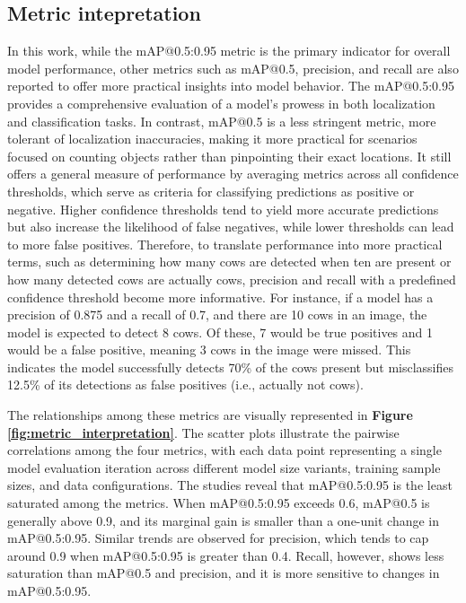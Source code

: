 \subsection*{Metric intepretation}

In this work, while the mAP@0.5:0.95 metric is the primary indicator for overall model performance, other metrics such as mAP@0.5, precision, and recall are also reported to offer more practical insights into model behavior. The mAP@0.5:0.95 provides a comprehensive evaluation of a model's prowess in both localization and classification tasks. In contrast, mAP@0.5 is a less stringent metric, more tolerant of localization inaccuracies, making it more practical for scenarios focused on counting objects rather than pinpointing their exact locations. It still offers a general measure of performance by averaging metrics across all confidence thresholds, which serve as criteria for classifying predictions as positive or negative. Higher confidence thresholds tend to yield more accurate predictions but also increase the likelihood of false negatives, while lower thresholds can lead to more false positives. Therefore, to translate performance into more practical terms, such as determining how many cows are detected when ten are present or how many detected cows are actually cows, precision and recall with a predefined confidence threshold become more informative. For instance, if a model has a precision of 0.875 and a recall of 0.7, and there are 10 cows in an image, the model is expected to detect 8 cows. Of these, 7 would be true positives and 1 would be a false positive, meaning 3 cows in the image were missed. This indicates the model successfully detects 70\% of the cows present but misclassifies 12.5\% of its detections as false positives (i.e., actually not cows).

The relationships among these metrics are visually represented in \textbf{Figure \ref{fig:metric_interpretation}}. The scatter plots illustrate the pairwise correlations among the four metrics, with each data point representing a single model evaluation iteration across different model size variants, training sample sizes, and data configurations. The studies reveal that mAP@0.5:0.95 is the least saturated among the metrics. When mAP@0.5:0.95 exceeds 0.6, mAP@0.5 is generally above 0.9, and its marginal gain is smaller than a one-unit change in mAP@0.5:0.95. Similar trends are observed for precision, which tends to cap around 0.9 when mAP@0.5:0.95 is greater than 0.4. Recall, however, shows less saturation than mAP@0.5 and precision, and it is more sensitive to changes in mAP@0.5:0.95.

